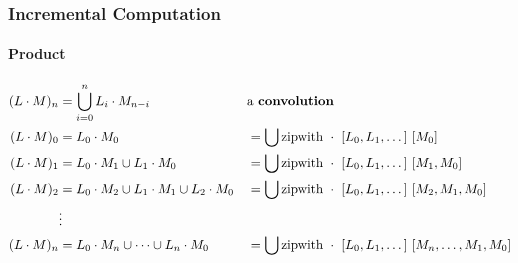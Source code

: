 \documentclass[pdftex,aspectratio=169]{beamer}
\begin{document}
\begin{frame}[fragile]
  \frametitle{Incremental Computation}
  \framesubtitle{Product}
  \vspace{-2.5\baselineskip}
  \begin{align*}
    (L \cdot M)_n & = \bigcup_{i=0}^n L_i \cdot M_{n-i} && \text{a \textbf{convolution}}
    \\
    (L \cdot M)_0 & = L_0 \cdot M_0 && = \bigcup \text{\lstinline{zipwith}}~\cdot~[L_0, L_1, \dots]~[M_0]
    \\
    (L \cdot M)_1 & = L_0 \cdot M_1 \cup L_1 \cdot M_0
                     && = \bigcup \text{\lstinline{zipwith}}~\cdot~[L_0, L_1, \dots]~[M_1, M_0]
    \\
    (L \cdot M)_2 & = L_0 \cdot M_2 \cup L_1 \cdot M_1 \cup L_2 \cdot M_0
                                                        && = \bigcup \text{\lstinline{zipwith}}~\cdot~[L_0, L_1, \dots]~[M_2, M_1, M_0]
    \\
                  &\vdots
    \\
    (L \cdot M)_n & = L_0 \cdot M_n \cup \dots \cup L_n \cdot M_0
                                                        && = \bigcup \text{\lstinline{zipwith}}~\cdot~[L_0, L_1, \dots]~[M_n,\dots, M_1, M_0]
  \end{align*}
\end{frame}
\end{document}
